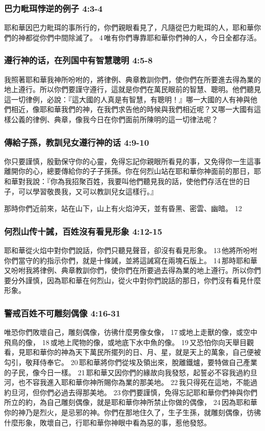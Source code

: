 \subsubsection{巴力毗珥悖逆的例子 4:3-4}
耶和華因巴力毗珥的事所行的，你們親眼看見了，凡隨從巴力毗珥的人，耶和華你們的神都從你們中間除滅了。 4 唯有你們專靠耶和華你們神的人，今日全都存活。

\subsubsection{遵行神的话，在列国中有智慧聰明 4:5-8}
我照著耶和華我神所吩咐的，將律例、典章教訓你們，使你們在所要進去得為業的地上遵行。所以你們要謹守遵行，這就是你們在萬民眼前的智慧、聰明。他們聽見這一切律例，必說：『這大國的人真是有智慧，有聰明！』哪一大國的人有神與他們相近，像耶和華我們的神，在我們求告他的時候與我們相近呢？又哪一大國有這樣公義的律例、典章，像我今日在你們面前所陳明的這一切律法呢？

\subsubsection{傳給子孫，教訓兒女遵行神的话 4:9-10}
你只要謹慎，殷勤保守你的心靈，免得忘記你親眼所看見的事，又免得你一生這事離開你的心，總要傳給你的子子孫孫。你在何烈山站在耶和華你神面前的那日，耶和華對我說：『你為我招聚百姓，我要叫他們聽見我的話，使他們存活在世的日子，可以學習敬畏我，又可以教訓兒女這樣行。』 


那時你們近前來，站在山下，山上有火焰沖天，並有昏黑、密雲、幽暗。 12 

\subsubsection{何烈山传十誡，百姓沒有看見形象 4:12-15}
耶和華從火焰中對你們說話，你們只聽見聲音，卻沒有看見形象。 13 他將所吩咐你們當守的約指示你們，就是十條誡，並將這誡寫在兩塊石版上。 14 那時耶和華又吩咐我將律例、典章教訓你們，使你們在所要過去得為業的地上遵行。所以你們要分外謹慎，因為耶和華在何烈山，從火中對你們說話的那日，你們沒有看見什麼形象。 


\subsubsection{警戒百姓不可雕刻偶像 4:16-31}
唯恐你們敗壞自己，雕刻偶像，彷彿什麼男像女像， 17 或地上走獸的像，或空中飛鳥的像， 18 或地上爬物的像，或地底下水中魚的像。 19 又恐怕你向天舉目觀看，見耶和華你的神為天下萬民所擺列的日、月、星，就是天上的萬象，自己便被勾引，敬拜侍奉它。 20 耶和華將你們從埃及領出來，脫離鐵爐，要特做自己產業的子民，像今日一樣。 21 耶和華又因你們的緣故向我發怒，起誓必不容我過約旦河，也不容我進入耶和華你神所賜你為業的那美地。 22 我只得死在這地，不能過約旦河，但你們必過去得那美地。 23 你們要謹慎，免得忘記耶和華你們神與你們所立的約，為自己雕刻偶像，就是耶和華你神所禁止你做的偶像， 24 因為耶和華你的神乃是烈火，是忌邪的神。你們在那地住久了，生子生孫，就雕刻偶像，彷彿什麼形象，敗壞自己，行耶和華你神眼中看為惡的事，惹他發怒。

